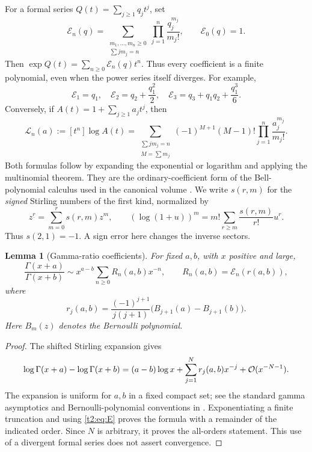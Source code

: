 \documentclass[11pt,openany]{book}
\numberwithin{equation}{chapter}
\theoremstyle{plain}
\newtheorem{lemma}[theorem]{Lemma}
\theoremstyle{definition}
\theoremstyle{remark}
\newcommand{\cE}{\mathcal E}\newcommand{\cL}{\mathcal L}
\newcommand{\fall}[2]{#1^{\underline{#2}}}
\begin{document}
For a formal series $Q(t)=\sum_{j\ge1}q_jt^j$, set
\begin{equation}
 \cE_n(q)=
 \sum_{\substack{m_1,\ldots,m_n\ge0\\\sum j m_j=n}}
       \prod_{j=1}^n\frac{q_j^{m_j}}{m_j!},
 \qquad \cE_0(q)=1.
 \label{t2:eq:E}
\end{equation}
Then $\exp Q(t)=\sum_{n\ge0}\cE_n(q)t^n$. Thus every coefficient is a finite polynomial, even when the power series itself diverges. For example,
\[
 \cE_1=q_1,\quad
 \cE_2=q_2+\frac{q_1^2}{2},\quad
 \cE_3=q_3+q_1q_2+\frac{q_1^3}{6}.
\]
Conversely, if $A(t)=1+\sum_{j\ge1}a_jt^j$, then
\begin{equation}
 \cL_n(a):=[t^n]\log A(t)
 =\sum_{\substack{\sum j m_j=n\\M=\sum m_j}}
   (-1)^{M+1}(M-1)!\prod_{j=1}^n\frac{a_j^{m_j}}{m_j!}.
 \label{t2:eq:L}
\end{equation}
Both formulas follow by expanding the exponential or logarithm and applying the multinomial theorem. They are the ordinary-coefficient form of the Bell-polynomial calculus used in the canonical volume \cite{tai}.
We write $s(r,m)$ for the \emph{signed} Stirling numbers of the first kind, normalized by
\begin{equation}
 \fall{z}{r}=\sum_{m=0}^r s(r,m)z^m,
 \qquad
 (\log(1+u))^m=m!\sum_{r\ge m}\frac{s(r,m)}{r!}u^r.
 \label{t1:eq:stirlingsign}
\end{equation}
Thus $s(2,1)=-1$. A sign error here changes the inverse sectors.
\begin{lemma}[Gamma-ratio coefficients]
\label{t2:lem:ratio}
For fixed $a,b$, with $x$ positive and large,
\begin{equation}
 \frac{\Gamma(x+a)}{\Gamma(x+b)}
 \sim x^{a-b}\sum_{n\ge0}R_n(a,b)x^{-n},
 \qquad R_n(a,b)=\cE_n(r(a,b)),
 \label{t2:eq:ratio}
\end{equation}
where
\begin{equation}
 r_j(a,b)=\frac{(-1)^{j+1}}{j(j+1)}
          \bigl(B_{j+1}(a)-B_{j+1}(b)\bigr).
 \label{t2:eq:ratio-log}
\end{equation}
Here $B_m(z)$ denotes the Bernoulli polynomial.
\end{lemma}
\begin{proof}
The shifted Stirling expansion gives
\[
 \log\Gamma(x+a)-\log\Gamma(x+b)
 =(a-b)\log x+\sum_{j=1}^{N}r_j(a,b)x^{-j}
       +\mathcal O(x^{-N-1}).
\]
The expansion is uniform for $a,b$ in a fixed compact set; see the standard gamma asymptotics and Bernoulli-polynomial conventions in \cite{dlmfgamma,dlmfbernoulli}. Exponentiating a finite truncation and using \eqref{t2:eq:E} proves the formula with a remainder of the indicated order. Since $N$ is arbitrary, it proves the all-orders statement. This use of a divergent formal series does not assert convergence.
\end{proof}
\end{document}
